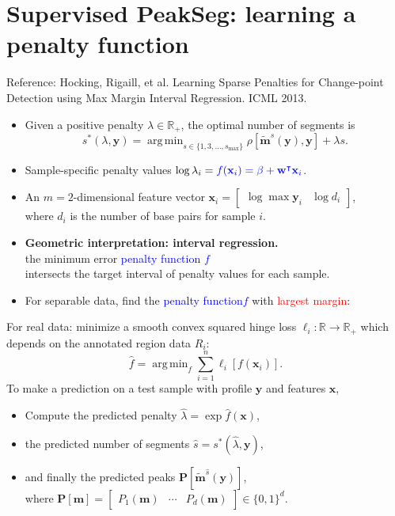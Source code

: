 \documentclass[legalpaper]{article}
\newcommand{\RR}{\mathbb R}
\DeclareMathOperator*{\argmin}{arg\,min}
\begin{document}
\newpage

\section*{Supervised PeakSeg: learning a penalty function}
Reference: Hocking, Rigaill, et al. Learning Sparse Penalties for
Change-point Detection using Max Margin Interval Regression. ICML
2013.

\begin{itemize}
\item Given a positive penalty $\lambda\in\RR_+$, the optimal number
  of segments is
\begin{equation*} s^*(\lambda, \mathbf y) =
    \argmin_{s\in\{1,3,\dots, s_{\text{max}}\}} \rho\left[
      \mathbf{\tilde m}^s(\mathbf y), \mathbf y \right] + \lambda s.
\end{equation*}
\item Sample-specific penalty values $\log \lambda_i = 
\textcolor{blue}{
  f(\mathbf x_i)
  = \beta + \mathbf w^\intercal \mathbf x_i
}$.
\item An $m=2$-dimensional feature vector
$\mathbf x_i = \left[\begin{array}{cc} \log\max \mathbf y_i & \log d_i
\end{array}\right]$,\\ where $d_i$ is the number of base pairs for 
sample $i$.
\item \textbf{Geometric interpretation: interval regression.} \\
  the minimum error
  \textcolor{blue}{penalty function $f$} \\
  intersects the target
  interval of penalty values for each sample.
\item For separable data, find the 
  \textcolor{blue}{penalty function$f$} 
with
\textcolor{red}{largest margin}:\\

\end{itemize}

\newpage

For real data: minimize a smooth convex squared hinge loss
$\ell_i:\RR\rightarrow\RR_+$ which depends on the annotated region
data $R_i$:
\begin{equation*}
  \label{eq:relax}
  \hat f = \argmin_f \sum_{i=1}^n
  \ell_i\left[ f(\mathbf x_i) \right].
\end{equation*}
To make a prediction on a
test sample with profile $\mathbf y$ and features $\mathbf x$,
\begin{itemize}
\item Compute the predicted penalty $\hat \lambda = \exp \hat f(\mathbf x)$,
\item the predicted number of segments $\hat s = s^*(\hat \lambda, \mathbf
y)$, 
\item and finally the predicted peaks $\mathbf P\left[ \mathbf{\tilde
    m}^{\hat s}(\mathbf y) \right]$,\\
where $\mathbf P[\mathbf m] = \left[\begin{array}{ccc}
    P_1(\mathbf m) & \cdots & P_d(\mathbf m)
\end{array}\right]\in\{0, 1\}^d$.
\end{itemize}
\end{document}
